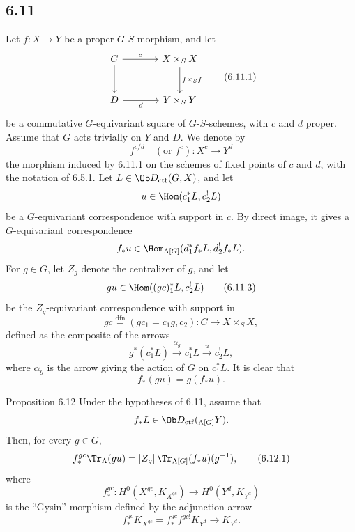 \subsection*{6.11}
Let $f:X\to Y$ be a proper $G$-$S$-morphism, and let
\begin{equation}
\begin{tikzcd}[column sep=large,row sep=large]
C \arrow[r,"c"] \arrow[d] & X\times_SX \arrow[d,"f\times_Sf"]\\
D \arrow[r,"d"'] & Y\times_SY
\end{tikzcd}
\tag{6.11.1}
\end{equation}
be a commutative $G$-equivariant square of $G$-$S$-schemes, with $c$ and $d$ proper. Assume that $G$ acts trivially on $Y$ and $D$. We denote by
\begin{equation}
f^{c/d}\quad(\text{or } f^c):X^c\longrightarrow Y^d
\tag{6.11.2}
\end{equation}
the morphism induced by 6.11.1 on the schemes of fixed points of $c$ and $d$, with the notation of 6.5.1. Let $L\in\Ob D_{\mathrm{ctf}}(G,X)$, and let
\[
u\in\Hom(c_1^*L,c_2^!L)
\]
be a $G$-equivariant correspondence with support in $c$. By direct image, it gives a $G$-equivariant correspondence
\[
f_*u\in\Hom_{\Lambda[G]}(d_1^*f_*L,d_2^!f_*L).
\]
For $g\in G$, let $Z_g$ denote the centralizer of $g$, and let
\begin{equation}
gu\in\Hom((gc)_1^*L,c_2^!L)
\tag{6.11.3}
\end{equation}
be the $Z_g$-equivariant correspondence with support in
\begin{equation}
gc\stackrel{\mathrm{dfn}}{=}(gc_1=c_1g,c_2):C\to X\times_SX,
\tag{6.11.4}
\end{equation}
defined as the composite of the arrows
\[
g^*(c_1^*L)\xrightarrow{\alpha_g}c_1^*L\xrightarrow{u}c_2^!L,
\]
where $\alpha_g$ is the arrow giving the action of $G$ on $c_1^*L$. It is clear that
\begin{equation}
f_*(gu)=g(f_*u).
\tag{6.11.5}
\end{equation}

\begin{statement}{Proposition 6.12}
Under the hypotheses of 6.11, assume that
\[
f_*L\in\Ob D_{\mathrm{ctf}}({}_{\Lambda[G]}Y).
\]
Then, for every $g\in G$,
\begin{equation}
f_*^{gc}\Tr_{\Lambda}(gu)
=
|Z_g|\,\Tr_{\Lambda[G]}(f_*u)(g^{-1}),
\tag{6.12.1}
\end{equation}
where
\[
f_*^{gc}:H^0(X^{gc},K_{X^{gc}})\longrightarrow H^0(Y^d,K_{Y^d})
\]
is the ``Gysin'' morphism defined by the adjunction arrow
\[
f_*^{gc}K_{X^{gc}}=f_*^{gc}f^{gc!}K_{Y^d}\longrightarrow K_{Y^d}.
\]
\end{statement}

